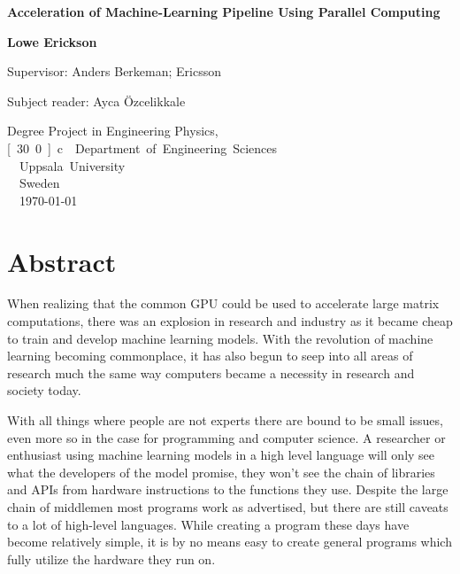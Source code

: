 \documentclass[12pt, a4paper]{article}
\title{}
\author{Lowe Erickson }
\date{May 2018}
\begin{document}
\begin{titlepage}
   \begin{center}
        \vspace*{1cm}
        \Huge
        \textbf{Acceleration of
        Machine-Learning Pipeline Using Parallel Computing}
 
        \LARGE
        \vspace{1cm}
       
        \textbf{Lowe Erickson}
 
        \vfill
        
        Supervisor: Anders Berkeman; Ericsson

        \vspace{0.5cm}
        
        Subject reader: Ayca Özcelikkale
        
        \vspace{0.5cm}

        Degree Project in Engineering Physics, \unit[30.0]{c}
 
        \vspace{0.8cm}
 
 
        Department of Engineering Sciences\\
        \vspace{0.2cm}
        Uppsala University\\
        \vspace{0.2cm}
        Sweden\\
        \vspace{0.2cm}
        \today
   \end{center}
\end{titlepage}



\section*{Abstract}
When realizing that the common GPU could be used to accelerate large matrix computations, there was an explosion in research and industry as it became cheap to train and develop machine learning models.
With the revolution of machine learning becoming commonplace, it has also begun to seep into all areas of research much the same way computers became a necessity in research and society today. \par

With all things where people are not experts there are bound to be small issues, even more so in the case for programming and computer science.
A researcher or enthusiast using machine learning models in a high level language will only see what the developers of the model promise, they won't see the chain of libraries and APIs from hardware instructions to the functions they use.
Despite the large chain of middlemen most programs work as advertised, but there are still caveats to a lot of high-level languages. 
While creating a program these days have become relatively simple, it is by no means easy to create general programs which fully utilize the hardware they run on. \par
\end{document}
